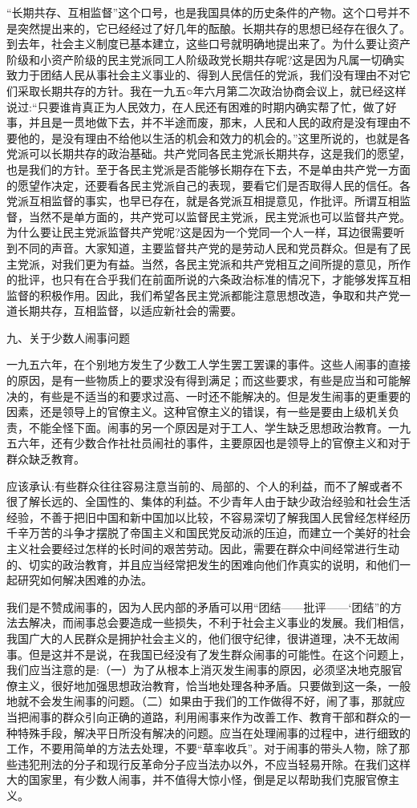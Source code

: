 \documentclass[UTF8, 12pt, a4paper]{ctexrep}
\begin{document}
“长期共存、互相监督”这个口号，也是我国具体的历史条件的产物。这个口号并不是突然提出来的，它已经经过了好几年的酝酿。长期共存的思想已经存在很久了。到去年，社会主义制度已基本建立，这些口号就明确地提出来了。为什么要让资产阶级和小资产阶级的民主党派同工人阶级政党长期共存呢?这是因为凡属一切确实致力于团结人民从事社会主义事业的、得到人民信任的党派，我们没有理由不对它们采取长期共存的方针。我在一九五○年六月第二次政治协商会议上，就已经这样说过:“只要谁肯真正为人民效力，在人民还有困难的时期内确实帮了忙，做了好事，并且是一贯地做下去，并不半途而废，那末，人民和人民的政府是没有理由不要他的，是没有理由不给他以生活的机会和效力的机会的。”这里所说的，也就是各党派可以长期共存的政治基础。共产党同各民主党派长期共存，这是我们的愿望，也是我们的方针。至于各民主党派是否能够长期存在下去，不是单由共产党一方面的愿望作决定，还要看各民主党派自己的表现，要看它们是否取得人民的信任。各党派互相监督的事实，也早已存在，就是各党派互相提意见，作批评。所谓互相监督，当然不是单方面的，共产党可以监督民主党派，民主党派也可以监督共产党。为什么要让民主党派监督共产党呢?这是因为一个党同一个人一样，耳边很需要听到不同的声音。大家知道，主要监督共产党的是劳动人民和党员群众。但是有了民主党派，对我们更为有益。当然，各民主党派和共产党相互之间所提的意见，所作的批评，也只有在合乎我们在前面所说的六条政治标准的情况下，才能够发挥互相监督的积极作用。因此，我们希望各民主党派都能注意思想改造，争取和共产党一道长期共存，互相监督，以适应新社会的需要。

九、关于少数人闹事问题

一九五六年，在个别地方发生了少数工人学生罢工罢课的事件。这些人闹事的直接的原因，是有一些物质上的要求没有得到满足；而这些要求，有些是应当和可能解决的，有些是不适当的和要求过高、一时还不能解决的。但是发生闹事的更重要的因素，还是领导上的官僚主义。这种官僚主义的错误，有一些是要由上级机关负责，不能全怪下面。闹事的另一个原因是对于工人、学生缺乏思想政治教育。一九五六年，还有少数合作社社员闹社的事件，主要原因也是领导上的官僚主义和对于群众缺乏教育。

应该承认:有些群众往往容易注意当前的、局部的、个人的利益，而不了解或者不很了解长远的、全国性的、集体的利益。不少青年人由于缺少政治经验和社会生活经验，不善于把旧中国和新中国加以比较，不容易深切了解我国人民曾经怎样经历千辛万苦的斗争才摆脱了帝国主义和国民党反动派的压迫，而建立一个美好的社会主义社会要经过怎样的长时间的艰苦劳动。因此，需要在群众中间经常进行生动的、切实的政治教育，并且应当经常把发生的困难向他们作真实的说明，和他们一起研究如何解决困难的办法。

我们是不赞成闹事的，因为人民内部的矛盾可以用“团结——批评——‘团结”的方法去解决，而闹事总会要造成一些损失，不利于社会主义事业的发展。我们相信，我国广大的人民群众是拥护社会主义的，他们很守纪律，很讲道理，决不无故闹事。但是这并不是说，在我国已经没有了发生群众闹事的可能性。在这个问题上，我们应当注意的是:（一）为了从根本上消灭发生闹事的原因，必须坚决地克服官僚主义，很好地加强思想政治教育，恰当地处理各种矛盾。只要做到这一条，一般地就不会发生闹事的问题。（二）如果由于我们的工作做得不好，闹了事，那就应当把闹事的群众引向正确的道路，利用闹事来作为改善工作、教育干部和群众的一种特殊手段，解决平日所没有解决的问题。应当在处理闹事的过程中，进行细致的工作，不要用简单的方法去处理，不要“草率收兵”。对于闹事的带头人物，除了那些违犯刑法的分子和现行反革命分子应当法办以外，不应当轻易开除。在我们这样大的国家里，有少数人闹事，并不值得大惊小怪，倒是足以帮助我们克服官僚主义。
\end{document}
